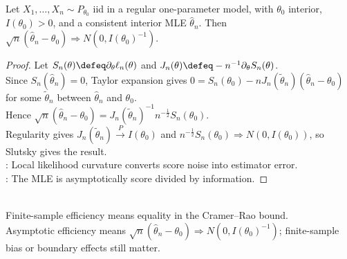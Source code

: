 \begin{theorem} \label{thm:mle-asymptotic-normality} \\
Let $X_1,\ldots,X_n\sim P_{\theta_0}$ iid in a regular one-parameter model, with $\theta_0$ interior, $I(\theta_0)>0$, and a consistent interior MLE $\widehat{\theta}_n$. Then $\sqrt{n}(\widehat{\theta}_n-\theta_0)\Rightarrow N(0,I(\theta_0)^{-1})$.
\begin{proof}
Let $S_n(\theta)\defeq\partial_\theta\ell_n(\theta)$ and $J_n(\theta)\defeq-n^{-1}\partial_\theta S_n(\theta)$.\\
Since $S_n(\widehat{\theta}_n)=0$, Taylor expansion gives $0=S_n(\theta_0)-nJ_n(\widetilde{\theta}_n)(\widehat{\theta}_n-\theta_0)$ for some $\widetilde{\theta}_n$ between $\widehat{\theta}_n$ and $\theta_0$.\\
Hence $\sqrt{n}(\widehat{\theta}_n-\theta_0)=J_n(\widetilde{\theta}_n)^{-1}n^{-\frac{1}{2}}S_n(\theta_0)$.\\
Regularity gives $J_n(\widetilde{\theta}_n)\xrightarrow{P}I(\theta_0)$ and $n^{-\frac{1}{2}}S_n(\theta_0)\Rightarrow N(0,I(\theta_0))$, so Slutsky gives the result.\\
: Local likelihood curvature converts score noise into estimator error.\\
: The MLE is asymptotically score divided by information.
\end{proof}
\end{theorem}

\begin{remark} \label{rem:asymptotic-efficiency-versus-finite-sample-efficiency} \\
Finite-sample efficiency means equality in the Cramer--Rao bound.\\
Asymptotic efficiency means $\sqrt{n}(\widehat{\theta}_n-\theta_0)\Rightarrow N(0,I(\theta_0)^{-1})$; finite-sample bias or boundary effects still matter.
\end{remark}
